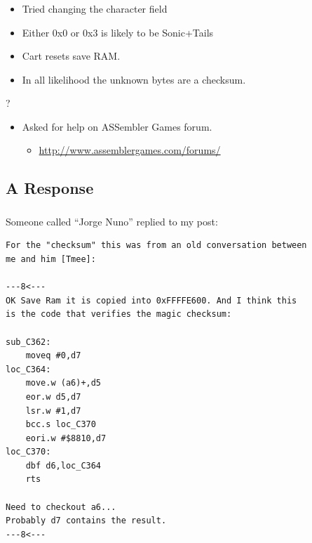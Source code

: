 \documentclass{beamer}
\begin{document}

\begin{frame}[fragile]
\frametitle{\insertsubsection}

\begin{itemize}
\item Tried changing the character field
\item Either 0x0 or 0x3 is likely to be Sonic+Tails
\item Cart resets save RAM.
\item In all likelihood the unknown bytes are a checksum.
\end{itemize}

\vfill

\begin{center}
{\Huge ?}
\end{center}

\pause

\vfill

\begin{itemize}
\item Asked for help on ASSembler Games forum.
\begin{itemize}
\item \url{http://www.assemblergames.com/forums/}
\end{itemize}
\end{itemize}

\vfill

\end{frame}


\subsection{A Response}

\begin{frame}[fragile]
\frametitle{\insertsubsection}

Someone called ``Jorge Nuno'' replied to my post:
\vfill


\begin{lstlisting}[basicstyle={\tt\scriptsize}]
For the "checksum" this was from an old conversation between
me and him [Tmee]:

---8<---
OK Save Ram it is copied into 0xFFFFE600. And I think this
is the code that verifies the magic checksum:

sub_C362:
    moveq #0,d7
loc_C364:
    move.w (a6)+,d5
    eor.w d5,d7
    lsr.w #1,d7
    bcc.s loc_C370
    eori.w #$8810,d7
loc_C370:
    dbf d6,loc_C364
    rts

Need to checkout a6...
Probably d7 contains the result. 
---8<---
\end{lstlisting}

\end{frame}
\end{document}
